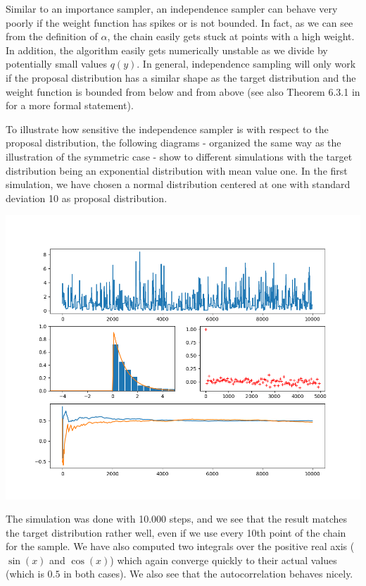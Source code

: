 \documentclass[a4paper, draft]{article}
\theoremstyle{own}
\theoremstyle{remark}
\begin{document}
Similar to an importance sampler, an independence sampler can behave very poorly
if the weight function has spikes or is not bounded. In fact, as we can see from the definition of $\alpha$, the chain easily gets stuck at points with a high weight. In addition, the algorithm easily gets numerically unstable as we divide by potentially small values $q(y)$. In general, independence sampling will only work if the proposal distribution has a similar shape as the target distribution and the weight function is bounded from below and from above (see also Theorem 6.3.1 in \cite{RobertCasella1999} for a more formal statement).

To illustrate how sensitive the independence sampler	 is with respect to the proposal distribution, the following diagrams - organized the same way as the illustration of the symmetric case - show to different simulations with the target distribution being an exponential distribution with mean value one. In the first simulation, we have chosen a normal distribution centered at one with standard deviation 10 as proposal distribution.

\includegraphics[scale=.45]{MetropolisIndependentGood.png}

The simulation was done with 10.000 steps, and we see that the result matches the target distribution rather well, even if we use every 10th point of the chain for the sample. We have also computed two integrals over the positive real axis ($\sin(x)$ and $\cos(x)$) which again converge quickly to their actual values (which is $0.5$ in both cases). We also see that the autocorrelation behaves nicely.
\end{document}
